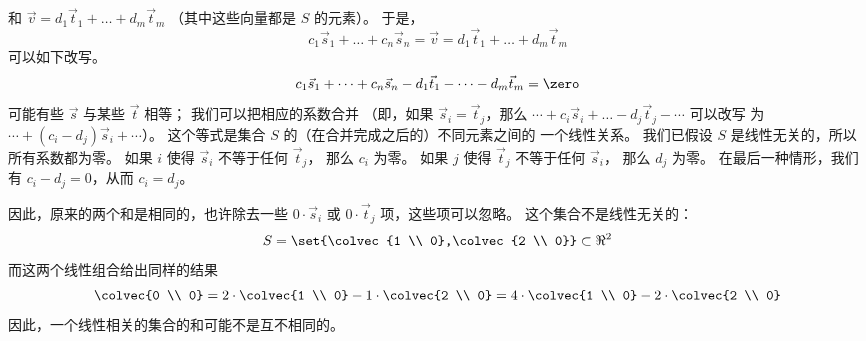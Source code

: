 \begin{exercises}
\begin{answer}
\begin{exparts}
          和 $\vec{v}=d_1\vec{t}_1+\dots+d_m\vec{t}_m$
          （其中这些向量都是 $S$ 的元素）。
          于是，
          \begin{equation*}
            c_1\vec{s}_1+\dots+c_n\vec{s}_n
            =\vec{v}
            =d_1\vec{t}_1+\dots+d_m\vec{t}_m
          \end{equation*}
          可以如下改写。
          \begin{equation*}
            c_1\vec{s}_1+\dots+c_n\vec{s}_n
            -d_1\vec{t}_1-\dots-d_m\vec{t}_m
            =\zero
          \end{equation*}
          可能有些 $\vec{s}$ 与某些 $\vec{t}$ 相等；
          我们可以把相应的系数合并
          （即，如果 $\vec{s}_i=\vec{t}_j$，那么
          $\cdots+c_i\vec{s}_i+\dots-d_j\vec{t}_j-\cdots$ 可以改写
          为 $\cdots+(c_i-d_j)\vec{s}_i+\cdots$）。
          这个等式是集合 $S$ 的（在合并完成之后的）不同元素之间的
          一个线性关系。
          我们已假设 $S$ 是线性无关的，所以所有系数都为零。
          如果 $i$ 使得 $\vec{s}_i$ 不等于任何 $\vec{t}_j$，
          那么 $c_i$ 为零。
          如果 $j$ 使得 $\vec{t}_j$ 不等于任何 $\vec{s}_i$，
          那么 $d_j$ 为零。
          在最后一种情形，我们有 $c_i-d_j=0$，从而 $c_i=d_j$。

          因此，原来的两个和是相同的，也许除去一些
          $0\cdot\vec{s}_i$ 或 $0\cdot\vec{t}_j$ 项，这些项可以忽略。
        \partsitem
          这个集合不是线性无关的：
          \begin{equation*}
            S=\set{\colvec{1 \\ 0},\colvec{2 \\ 0}}\subset\Re^2
          \end{equation*}
          而这两个线性组合给出同样的结果
          \begin{equation*}
            \colvec{0 \\ 0}=2\cdot\colvec{1 \\ 0}-1\cdot\colvec{2 \\ 0}
                            =4\cdot\colvec{1 \\ 0}-2\cdot\colvec{2 \\ 0}
          \end{equation*}
          因此，一个线性相关的集合的和可能不是互不相同的。


\end{exparts}
\end{answer}
\end{exercises}
